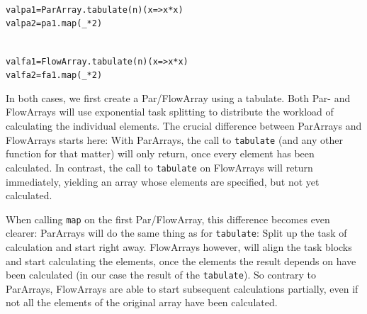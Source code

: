 \documentclass[runningheads,a4paper,fleqn]{llncs}
\begin{document}
\noindent
\begin{minipage}[t]{.45\textwidth}
\begin{alltt}
{\scriptsize
val pa1 = ParArray.tabulate(n)(x => x*x)
val pa2 = pa1.map(_ * 2)
}
\end{alltt}
\end{minipage}
\begin{minipage}[t]{.45\textwidth}
\begin{alltt}
{\scriptsize
val fa1 = FlowArray.tabulate(n)(x => x*x)
val fa2 = fa1.map(_ * 2)
}
\end{alltt}
\end{minipage}

In both cases, we first create a Par/FlowArray using a tabulate. Both
Par- and FlowArrays will use exponential task splitting
\cite{collect11,cong08} to distribute the workload of calculating the
individual elements. The crucial difference between ParArrays and
FlowArrays starts here: With ParArrays, the call to \texttt{tabulate}
(and any other function for that matter) will only return, once every
element has been calculated. In contrast, the call to
\texttt{tabulate} on FlowArrays will return immediately, yielding an
array whose elements are specified, but not yet calculated.

When calling \texttt{map} on the first Par/FlowArray, this difference
becomes even clearer: ParArrays will do the same thing as for
\texttt{tabulate}: Split up the task of calculation and start right
away. FlowArrays however, will align the task blocks and start
calculating the elements, once the elements the result depends on have
been calculated (in our case the result of the \texttt{tabulate}). So
contrary to ParArrays, FlowArrays are able to start subsequent
calculations partially, even if not all the elements of the original
array have been calculated.
\end{document}
